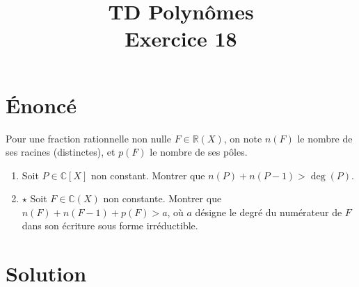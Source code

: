 \documentclass[french]{article}
\title{TD Polynômes \\ Exercice 18}
\date{}
\newcommand{\R}{\mathbb{R}}
\newcommand{\C}{\mathbb{C}}
\begin{document}
\maketitle

\section{Énoncé}
Pour une fraction rationnelle non nulle $F\in\R(X)$, on note $n(F)$ le nombre de ses racines (distinctes), et $p(F)$ le nombre de ses pôles.
\begin{enumerate}
	\item Soit $P\in\C[X]$ non constant. Montrer que $n(P)+n(P-1)>\deg(P)$.
	\item $\star$ Soit $F\in\C(X)$ non constante. Montrer que $n(F)+n(F-1)+p(F)>a$, où $a$ désigne le degré du numérateur de $F$ dans son écriture sous forme irréductible.
\end{enumerate}
\section{Solution}
\end{document}
